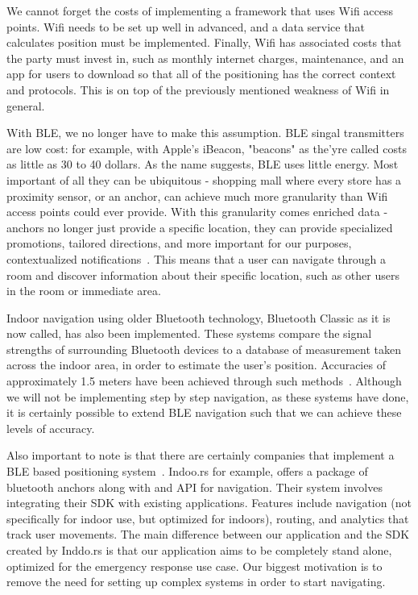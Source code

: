 \documentclass{sig-alternate}
\begin{document}
We cannot forget the costs of implementing a framework that 
uses Wifi access points. Wifi needs to be set up well in 
advanced, and a data service that calculates position must be
implemented. Finally, Wifi has associated costs that the party must
invest in, such as monthly internet charges, maintenance, and an
app for users to download so that all of the positioning has the
correct context and protocols. This is on top of the previously
mentioned weakness of Wifi in general.

With BLE, we no longer have to make this assumption. BLE
singal transmitters are low cost: for example, with Apple's iBeacon, 
"beacons" as the'yre called costs as little as 30 to 40 dollars. As 
the name suggests, BLE uses little energy. Most important of all
they can be ubiquitous - shopping mall where every store has a
proximity sensor, or an anchor, can achieve much more granularity
than Wifi access points could ever provide. With this granularity
comes enriched data - anchors no longer just provide a specific
location, they can provide specialized promotions, tailored 
directions, and more important for our purposes, contextualized
notifications~\cite{gottipati}. This means that a user can
navigate through a room and discover information about their
specific location, such as other users in the room or immediate
area.

Indoor navigation using older Bluetooth technology, Bluetooth
Classic as it is now called, has also been implemented. These
systems compare the signal strengths of surrounding Bluetooth
devices to a database of measurement taken across the indoor 
area, in order to estimate the user's position. Accuracies of
approximately 1.5 meters have been achieved through such
methods~\cite{bekkelien}. Although we will not be implementing 
step by step navigation, as these systems have done, it is certainly 
possible to extend BLE navigation such that we can achieve these 
levels of accuracy. 

Also important to note is that there are certainly companies 
that implement a BLE based positioning system~\cite{indoo.rs}.
Indoo.rs for example, offers a package 
of bluetooth anchors along with and API for navigation. Their 
system involves integrating their SDK with existing applications. 
Features include navigation (not specifically for indoor use, but 
optimized for indoors), routing, and analytics that track user 
movements. The main difference between our application and 
the SDK created by Inddo.rs is that our application aims to be 
completely stand alone, optimized for the emergency response 
use case. Our biggest motivation is to remove the need for setting 
up complex systems in order to start navigating.
\end{document}
